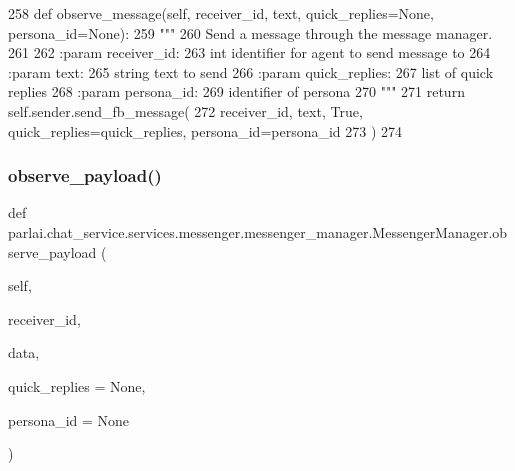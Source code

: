 \begin{DoxyCode}
258     \textcolor{keyword}{def }observe\_message(self, receiver\_id, text, quick\_replies=None, persona\_id=None):
259         \textcolor{stringliteral}{"""}
260 \textcolor{stringliteral}{        Send a message through the message manager.}
261 \textcolor{stringliteral}{}
262 \textcolor{stringliteral}{        :param receiver\_id:}
263 \textcolor{stringliteral}{            int identifier for agent to send message to}
264 \textcolor{stringliteral}{        :param text:}
265 \textcolor{stringliteral}{            string text to send}
266 \textcolor{stringliteral}{        :param quick\_replies:}
267 \textcolor{stringliteral}{            list of quick replies}
268 \textcolor{stringliteral}{        :param persona\_id:}
269 \textcolor{stringliteral}{            identifier of persona}
270 \textcolor{stringliteral}{        """}
271         \textcolor{keywordflow}{return} self.sender.send\_fb\_message(
272             receiver\_id, text, \textcolor{keyword}{True}, quick\_replies=quick\_replies, persona\_id=persona\_id
273         )
274 
\end{DoxyCode}
\mbox{\label{classparlai_1_1chat__service_1_1services_1_1messenger_1_1messenger__manager_1_1MessengerManager_ad969bb72a7095bde4f48be0a403e9471}} 
\subsubsection{\texorpdfstring{observe\+\_\+payload()}{observe\_payload()}}
{\footnotesize\ttfamily def parlai.\+chat\+\_\+service.\+services.\+messenger.\+messenger\+\_\+manager.\+Messenger\+Manager.\+observe\+\_\+payload (\begin{DoxyParamCaption}\item[{}]{self,  }\item[{}]{receiver\+\_\+id,  }\item[{}]{data,  }\item[{}]{quick\+\_\+replies = {\ttfamily None},  }\item[{}]{persona\+\_\+id = {\ttfamily None} }\end{DoxyParamCaption})}

